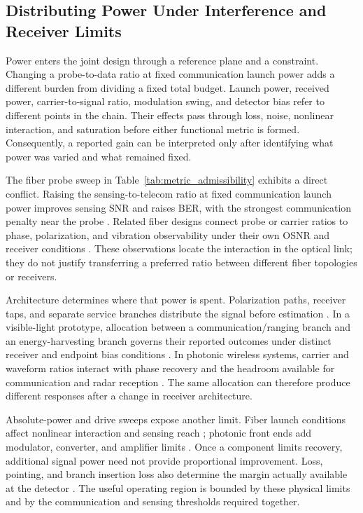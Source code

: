 \subsection{Distributing Power Under Interference and Receiver Limits}

Power enters the joint design through a reference plane and a constraint.
Changing a probe-to-data ratio at fixed communication launch power adds a
different burden from dividing a fixed total budget. Launch power, received
power, carrier-to-signal ratio, modulation swing, and detector bias refer to
different points in the chain. Their effects pass through loss, noise,
nonlinear interaction, and saturation before either functional metric is
formed. Consequently, a reported gain can be interpreted only after identifying
what power was varied and what remained fixed.

The fiber probe sweep in Table~\ref{tab:metric_admissibility} exhibits a direct
conflict. Raising the sensing-to-telecom ratio at fixed communication launch
power improves sensing SNR and raises BER, with the strongest communication
penalty near the probe \cite{OISAC_SCR00057}. Related fiber designs connect
probe or carrier ratios to phase, polarization, and vibration observability
under their own OSNR and receiver conditions
\cite{OISAC_SCR00013,OISAC_SCR00072,OISAC_SCR00220}. These observations locate
the interaction in the optical link; they do not justify transferring a
preferred ratio between different fiber topologies or receivers.

Architecture determines where that power is spent. Polarization paths, receiver
taps, and separate service branches distribute the signal before estimation
\cite{OISAC_SCR00346,OISAC_SCR01072,OISAC_SCR01075}. In a visible-light
prototype, allocation between a communication/ranging branch and an
energy-harvesting branch governs their reported outcomes under distinct
receiver and endpoint bias conditions \cite{OISAC_SCR01025}. In photonic
wireless systems, carrier and waveform ratios interact with phase recovery and
the headroom available for communication and radar reception
\cite{OISAC_SCR00492,OISAC_SCR00954,OISAC_SCR00966}. The same allocation can
therefore produce different responses after a change in receiver architecture.

Absolute-power and drive sweeps expose another limit. Fiber launch conditions
affect nonlinear interaction and sensing reach
\cite{OISAC_SCR00473,OISAC_SCR01079,OISAC_SCR01180}; photonic front ends add
modulator, converter, and amplifier limits
\cite{OISAC_SCR00631,OISAC_SCR00986,OISAC_SCR01012}. Once a component limits
recovery, additional signal power need not provide proportional improvement.
Loss, pointing, and branch insertion loss also determine the margin actually
available at the detector \cite{OISAC_SCR00002,OISAC_SCR00218,OISAC_SCR00506}.
The useful operating region is bounded by these physical limits and by the
communication and sensing thresholds required together.

